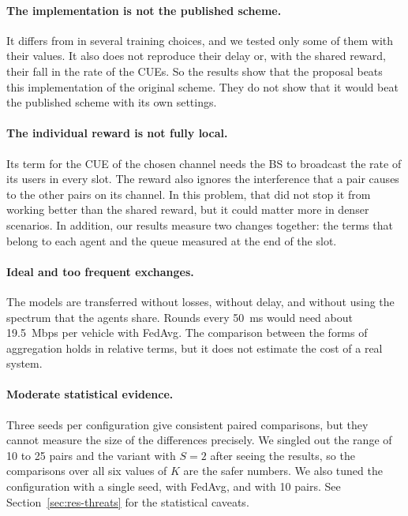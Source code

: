 \paragraph{The implementation is not the published scheme.} It differs from \citet{li+22fedmarl} in several
training choices, and we tested only some of them with their values. It also does not reproduce their delay or,
with the shared reward, their fall in the rate of the \acp{CUE}. So the results show that the proposal beats this
implementation of the original scheme. They do not show that it would beat the published scheme with its own
settings.

\paragraph{The individual reward is not fully local.} Its term for the \ac{CUE} of the chosen channel needs the
\ac{BS} to broadcast the rate of its users in every slot. The reward also ignores the interference that a pair
causes to the other pairs on its channel. In this problem, that did not stop it from working better than the
shared reward, but it could matter more in denser scenarios. In addition, our results measure two changes
together: the terms that belong to each agent and the queue measured at the end of the slot.

\paragraph{Ideal and too frequent exchanges.} The models are transferred without losses, without delay, and
without using the spectrum that the agents share. Rounds every \SI{50}{\milli\second} would need about
\SI{19.5}{Mbps} per vehicle with \ac{FedAvg}. The comparison between the forms of aggregation holds in relative
terms, but it does not estimate the cost of a real system.

\paragraph{Moderate statistical evidence.} Three seeds per configuration give consistent paired comparisons, but
they cannot measure the size of the differences precisely. We singled out the range of 10 to 25 pairs and the
variant with $S = 2$ after seeing the results, so the comparisons over all six values of $K$ are the safer
numbers. We also tuned the configuration with a single seed, with \ac{FedAvg}, and with 10 pairs. See
Section~\ref{sec:res-threats} for the statistical caveats.

